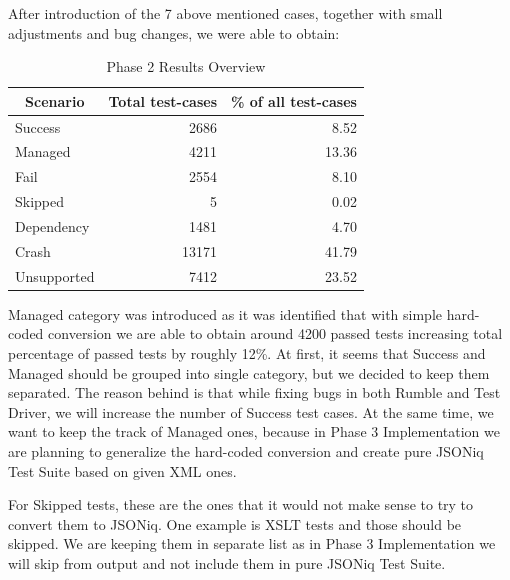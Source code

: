 After introduction of the 7 above mentioned cases, together with small adjustments and bug changes, we were able to obtain:
\begin{table}[h!]
	\centering
	\begin{tabular}{|l|r|r|}
		\hline
		\multicolumn{1}{|c|}{Scenario} & \multicolumn{1}{c|}{Total test-cases} & \multicolumn{1}{c|}{\% of all test-cases} \\ \hline
		Success                        & 2686                                  & 8.52                                      \\ \hline
		Managed                        & 4211                                  & 13.36                                     \\ \hline
		Fail                           & 2554                                  & 8.10                                      \\ \hline
		Skipped                        & 5                                     & 0.02                                      \\ \hline
		Dependency                     & 1481                                  & 4.70                                      \\ \hline
		Crash                          & 13171                                 & 41.79                                     \\ \hline
		Unsupported                    & 7412                                  & 23.52                                     \\ \hline
	\end{tabular}
	\caption{Phase 2 Results Overview}
	\label{tab:Phase2_ResultTable}
\end{table}

Managed category was introduced as it was identified that with simple hard-coded conversion we are able to obtain around 4200 passed tests increasing total percentage of passed tests by roughly 12\%. At first, it seems that Success and Managed should be grouped into single category, but we decided to keep them separated. The reason behind is that while fixing bugs in both Rumble and Test Driver, we will increase the number of Success test cases. At the same time, we want to keep the track of Managed ones, because in Phase 3 Implementation we are planning to generalize the hard-coded conversion and create pure JSONiq Test Suite based on given XML ones.

For Skipped tests, these are the ones that it would not make sense to try to convert them to JSONiq. One example is XSLT tests and those should be skipped. We are keeping them in separate list as in Phase 3 Implementation we will skip from output and not include them in pure JSONiq Test Suite.

